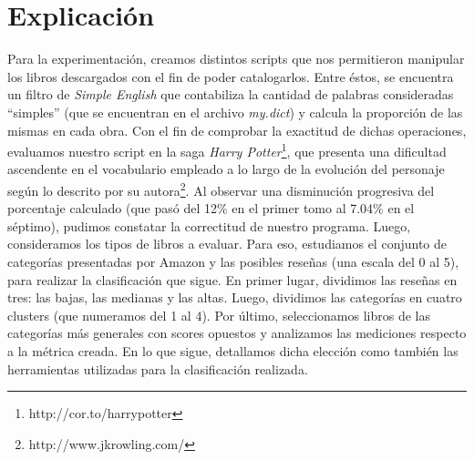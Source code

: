 \documentclass[12pt,journal,compsoc]{IEEEtran}
\begin{document}
\section{Explicación}
Para la experimentación, creamos distintos scripts que nos permitieron manipular los libros descargados con el fin de poder catalogarlos. Entre éstos, se encuentra un filtro de \textit{Simple English} que contabiliza la cantidad de palabras consideradas ``simples'' (que se encuentran en el archivo \textit{my.dict}) y calcula la proporción de las mismas en cada obra. Con el fin de comprobar la exactitud de dichas operaciones, evaluamos nuestro script en la saga \textit{Harry Potter}\footnote{http://cor.to/harrypotter}, que presenta una dificultad ascendente en el vocabulario empleado a lo largo de la evolución del personaje según lo descrito por su autora\footnote{http://www.jkrowling.com/}. Al observar una disminución progresiva del porcentaje calculado (que pasó del 12\% en el primer tomo al 7.04\% en el séptimo), pudimos constatar la correctitud de nuestro programa.
Luego, consideramos los tipos de libros a evaluar. Para eso, estudiamos el conjunto de categorías presentadas por Amazon y las posibles reseñas (una escala del 0 al 5), para realizar la clasificación que sigue. En primer lugar, dividimos las reseñas en tres: las bajas, las medianas y las altas. Luego, dividimos las categorías en cuatro clusters (que numeramos del 1 al 4). Por último, seleccionamos libros de las categorías más generales con scores opuestos y analizamos las mediciones respecto a la métrica creada. En lo que sigue, detallamos dicha elección como también las herramientas utilizadas para la clasificación realizada.
\end{document}
